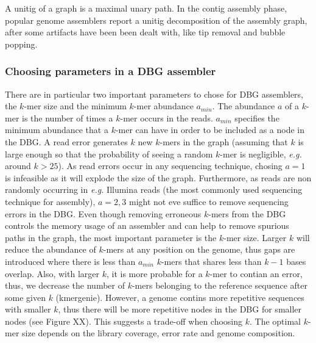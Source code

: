 \documentclass[a4paper,11pt]{article}
\newcommand{\kristoffer}[1]{{\color{red}{#1}}}
\begin{document}
A unitig of a graph is a maximal unary path. In the contig assembly phase, popular genome assemblers report a unitig decomposition of the assembly graph, after some artifacts have been been dealt with, like tip removal and bubble popping.

\subsubsection{Choosing parameters in a DBG assembler} %
\label{ssub:choosing_parameters_in_a_dbg_assembler}


There are in particular two important parameters to chose for DBG assemblers, the $k$-mer size and the minimum $k$-mer abundance $a_{min}$. The abundance $a$ of a $k$-mer is the number of times a $k$-mer occurs in the reads. $a_{min}$ specifies the minimum abundance that a $k$-mer can have in order to be included as a node in the DBG.  A read error generates $k$ new $k$-mers in the graph (assuming that $k$ is large enough so that the probability of seeing a random $k$-mer is negligible, \emph{e.g.} around $k>25$). As read errors occur in any sequencing technique, chosing $a=1$ is infeasible as it will explode the size of the graph. Furthermore, as reads are non randomly occurring in \emph{e.g.} Illumina reads (the most commonly used sequencing technique for assembly), $a=2,3$ might not eve suffice to remove sequencing errors in the DBG. Even though removing erroneous $k$-mers from the DBG controls the memory usage of an assembler and can help to remove spurious paths in the graph, the most important parameter is the $k$-mer size. Larger $k$ will reduce the abundance of $k$-mers at any position on the genome, thus gaps are introduced where there is less than $a_{min}$ $k$-mers that shares less than $k-1$ bases overlap. Also, with larger $k$, it is more probable for a $k$-mer to contian an error, thus, we decrease the number of $k$-mers belonging to the reference sequence after some given $k$ (kmergenie). However, a genome contins more repetitive sequences with smaller $k$, thus there will be more repetitive nodes in the DBG for smaller nodes (see Figure XX). This suggests a trade-off when choosing $k$. The optimal $k$-mer size depends on the library coverage, error rate and genome composition. \kristoffer{cite optimal-, kmergenie, k and say som smart things about it here} 
 
\kristoffer{Mention that too high k can intruduce missassemblies even for unitigs as a repetitive region A,B---R---C,D appear unary if a and C are removed from the graph due to the increased k-mer length (if ARC anf BRD are true paths), this should be unlikely though. Illustrate this in the k=4 grapg in illustration with lost coverage over the CAA repeat (need one more nucleotide then in that case)}
\end{document}
